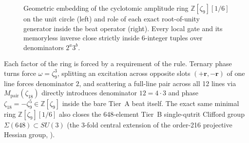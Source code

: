 \begin{figure}[htbp]
\caption{Geometric embedding of the cyclotomic amplitude ring $\mathbb{Z}[\zeta_9][1/6]$ on the unit circle (left) and
role of each exact root-of-unity generator inside the beat operator (right). Every local gate and its memoryless inverse
close strictly inside 6-integer tuples over denominators $2^a 3^b$.}
\label{fig:cyclotomic-circle}
\end{figure}

Each factor of the ring is forced by a requirement of the rule. Ternary phase turns force
$\omega = \zeta_9^3$, splitting an excitation across opposite slots
$(+\mathbf{r}, -\mathbf{r})$ of one line forces denominator $2$, and scattering a full-line pair across all 12 lines
via $M_{\mathrm{pair}}(\zeta_{18})$ directly introduces denominator $12 = 4 \cdot 3$ and phase
$\zeta_{18} = -\zeta_9^5 \in \mathbb{Z}[\zeta_9]$ inside the bare Tier~A beat itself. The exact same minimal ring
$\mathbb{Z}[\zeta_9][1/6]$ also closes the 648-element Tier~B single-qutrit Clifford group $\Sigma(648) \subset SU(3)$
(the 3-fold central extension of the order-216 projective Hessian group, ).

